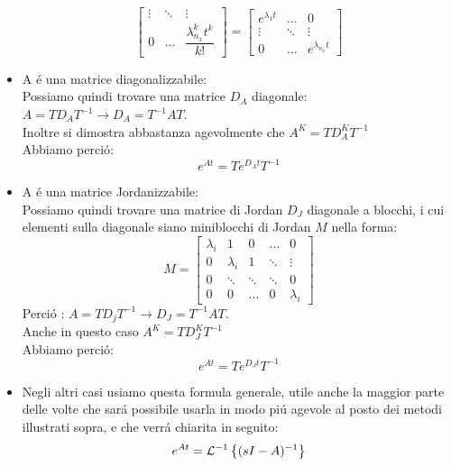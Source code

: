 \documentclass[../main.tex]{subfiles}
\begin{document}
\begin{itemize}
\[\begin{bmatrix}
						\vdots & \ddots & \vdots
						\\
						0 & \dots & \dfrac{\lambda_{n_x}^k t^k}{k!}
					\end{bmatrix} = 
					\begin{bmatrix}
						e^{\lambda_1 t} & \dots & 0
						\\[0.5em]
						\vdots & \ddots & \vdots
						\\[0.5em]
						0 & \dots & e^{\lambda_{n_x} t}
					\end{bmatrix}
				\]
			\item
				A \'e una matrice diagonalizzabile:\\
				Possiamo quindi trovare una matrice $D_A$ diagonale: $ A=T D_A T^{-1} \rightarrow D_A=T^{-1} A T $.\\
				Inoltre si dimostra abbastanza agevolmente che $ A^K =T D_A^K T^{-1}$\\
				Abbiamo perci\'o:
				\[
				e^{At} = T e^{D_A t} T^{-1}
				\]
			\item
				A \'e una matrice Jordanizzabile:\\
				Possiamo quindi trovare una matrice di Jordan $D_J$ diagonale a blocchi, i cui elementi sulla diagonale siano miniblocchi di Jordan $M$ nella forma:
				\[
					M=
					\begin{bmatrix}
					\lambda_i & 1 & 0 & \dots & 0
					\\
					0 & \lambda_i & 1 & \ddots & \vdots
					\\
					0 & \ddots & \ddots & \ddots & 0
					\\
					0 & 0 & \dots & 0 & \lambda_i
					\end{bmatrix}
				\]
				Perci\'o : $ A=T D_j T^{-1} \rightarrow D_J=T^{-1} A T $.\\
				Anche in questo caso $ A^K =T D_J^K T^{-1}$\\
				Abbiamo perci\'o:
				\[
				e^{At} = T e^{D_J t} T^{-1}
				\]
			\item
				Negli altri casi usiamo questa formula generale, utile anche la maggior parte delle volte che sar\'a possibile usarla in modo pi\'u agevole al posto dei metodi illustrati sopra, e che verr\'a chiarita in seguito:
				\[
					e^{At} = \mathcal{L}^{-1} \left\lbrace (sI-A)^{-1} \right\rbrace
				\]
				
				\begin{mdframed}[style=Esempio]

\end{mdframed}
\end{itemize}
\end{document}
